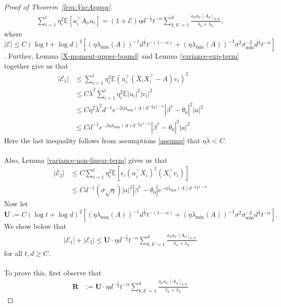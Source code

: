 \documentclass[11pt, reqno,english]{amsart}
\begin{document}
\begin{proof}[Proof of Theorem~\ref{lem:VarAsymp}]
\begin{align*}
\sum_{i = 1}^t \eta^2_i\mathbb{E}[u^\top_i A_{\sigma} u_i] = (1 + \mathcal E)\eta d^{-\frac{1}{2}}t^{-\alpha} \sum_{k,k'=1}^d \frac{a_{k}a_{k'}[A_{\sigma}]_{k,k'}}{\lambda_k + \lambda_{k'}},
\end{align*}
where $|\mathcal E| \leq  C(\log t + \log d)^2 [(\eta \lambda_{\min}(A))^{-1}d^{\frac{1}{2}}t^{-(1-\alpha)} + (\eta \lambda_{\min}(A))^{-3}\sigma^2\sigma_{\min}^{-2}d^{\frac{1}{2}}t^{-\alpha}]$. Further, Lemma \ref{X-moment-upper-bound} and Lemma \ref{variance-exp-term} together give us that
\begin{align*}
|\mathcal E_1| &\leq \sum_{i = 1}^t \eta^2_i\mathbb{E}(u^\top_i(X_iX^\top_i - A)v_i)^2
\\
&\leq C\bar{\lambda}^2 \sum_{i = 1}^t \eta^2_i\mathbb{E}|u_i|^2 |v_i|^2
\\
&\leq C\eta^2 \bar{\lambda}^2 d^{-1} e^{-2\eta \lambda_{\min}(A) d^{-\frac{1}{2}}t^{1-\alpha}}|\beta^* - \theta_0|^2 |a|^2
\\
&\leq C d^{-1} e^{-2\eta \lambda_{\min}(A) d^{-\frac{1}{2}}t^{1-\alpha}}|\beta^* - \theta_0|^2 |a|^2.
\end{align*}
Here the last inequality follows from assumptions \ref{assump} that $\eta \bar{\lambda} < C$. 
\\\\
Also, Lemma \ref{variance-non-linear-term} gives us that
\begin{align*}
|\mathcal E_2| &\leq C\sum_{i = 1}^t\eta^2_i\mathbb{E}[\epsilon_i (u^\top_iX_i)^2 (X^\top_iv_i)]
\\
&\leq Cd^{-1}(\sigma \sqrt{\eta}) |a|^2 |\beta^* - \theta_0|e^{-\eta \lambda_{\min}(A)d^{-\frac{1}{2}}t^{1-\alpha}}
\end{align*}
Now let $$\mathbf{U}:= C(\log t + \log d)^2 [(\eta \lambda_{\min}(A))^{-1}d^{\frac{1}{2}}t^{-(1-\alpha)} + (\eta \lambda_{\min}(A))^{-3}\sigma^2\sigma_{\min}^{-2}d^{\frac{1}{2}}t^{-\alpha}].$$ 
We show below that
\begin{align*}
    |\mathcal E_1| + |\mathcal E_2| \leq \mathbf{U}\cdot\eta d^{-\frac{1}{2}}t^{-\alpha}\sum_{k,k' = 1}^d \frac{a_k a_{k'}[A_{\sigma}]_{k,k'}}{\lambda_k + \lambda_{k'}}
\end{align*}
for all $t, d \geq C$.
\\\\
To prove this, first observe that
\begin{align*}
\mathbf{R} &:= \mathbf{U}\cdot\eta d^{-\frac{1}{2}}t^{-\alpha}\sum_{k,k' = 1}^d \frac{a_k a_{k'}[A_{\sigma}]_{k,k'}}{\lambda_k + \lambda_{k'}}

\end{align*}
\end{proof}
\end{document}
